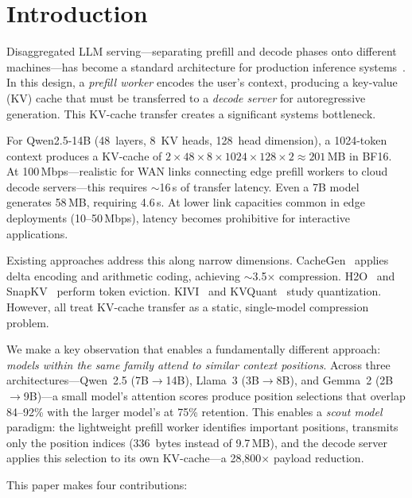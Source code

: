 \documentclass{article}
\begin{document}
\section{Introduction}
\label{sec:intro}

Disaggregated LLM serving---separating prefill and decode phases onto different machines---has become a standard architecture for production inference systems~\citep{splitwise,distserve,mooncake}.
In this design, a \emph{prefill worker} encodes the user's context, producing a key-value (KV) cache that must be transferred to a \emph{decode server} for autoregressive generation.
This KV-cache transfer creates a significant systems bottleneck.

For Qwen2.5-14B (48~layers, 8~KV heads, 128~head dimension), a 1024-token context produces a KV-cache of $2 \times 48 \times 8 \times 1024 \times 128 \times 2 \approx 201$\,MB in BF16.
At 100\,Mbps---realistic for WAN links connecting edge prefill workers to cloud decode servers---this requires $\sim$16\,s of transfer latency.
Even a 7B model generates 58\,MB, requiring 4.6\,s.
At lower link capacities common in edge deployments (10--50\,Mbps), latency becomes prohibitive for interactive applications.

Existing approaches address this along narrow dimensions.
CacheGen~\citep{cachegen} applies delta encoding and arithmetic coding, achieving $\sim$3.5$\times$ compression.
H2O~\citep{h2o} and SnapKV~\citep{snapkv} perform token eviction.
KIVI~\citep{kivi} and KVQuant~\citep{kvquant} study quantization.
However, all treat KV-cache transfer as a static, single-model compression problem.

We make a key observation that enables a fundamentally different approach: \emph{models within the same family attend to similar context positions}.
Across three architectures---Qwen~2.5 (7B$\to$14B), Llama~3 (3B$\to$8B), and Gemma~2 (2B$\to$9B)---a small model's attention scores produce position selections that overlap 84--92\% with the larger model's at 75\% retention.
This enables a \emph{scout model} paradigm: the lightweight prefill worker identifies important positions, transmits only the position indices (336~bytes instead of 9.7\,MB), and the decode server applies this selection to its own KV-cache---a 28{,}800$\times$ payload reduction.

This paper makes four contributions:
\end{document}
